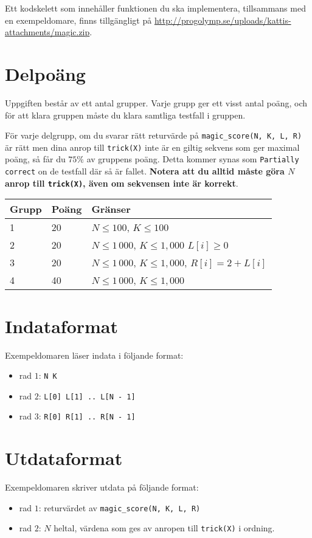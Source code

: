 Ett kodskelett som innehåller funktionen du ska implementera, tillsammans med en exempeldomare, finns tillgängligt på
\url{http://progolymp.se/uploads/kattis-attachments/magic.zip}.

\section*{Delpoäng}
Uppgiften består av ett antal grupper. Varje grupp ger ett visst antal poäng, och för att klara
gruppen måste du klara samtliga testfall i gruppen.

För varje delgrupp, om du svarar rätt returvärde på \texttt{magic\_score(N, K, L, R)} är rätt men dina anrop till \texttt{trick(X)}
inte är en giltig sekvens som ger maximal poäng, så får du $75\%$ av gruppens poäng.
Detta kommer synas som \texttt{Partially correct} on de testfall där så är fallet. \textbf{Notera att du alltid måste göra $N$ anrop till \texttt{trick(X)},
även om sekvensen inte är korrekt}.

\begin{tabular}{|l|l|l|}
  \hline
  \textbf{Grupp} & \textbf{Poäng} & \textbf{Gränser} \\ \hline
  1 & 20 & $N \le 100$, $K \le 100$ \\ \hline
  2 & 20 & $N \le 1\,000$, $K \le 1,000$ $L[i] \ge 0$\\ \hline
  3 & 20 & $N \le 1\,000$, $K \le 1,000$, $R[i] = 2 + L[i]$ \\ \hline
  4 & 40 & $N \le 1\,000$, $K \le 1,000$ \\ \hline
\end{tabular}

\section*{Indataformat}
Exempeldomaren läser indata i följande format:

\begin{itemize}
  \item rad $1$: \texttt{N K}
  \item rad $2$: \texttt{L[0] L[1] .. L[N - 1]}
  \item rad $3$: \texttt{R[0] R[1] .. R[N - 1]}
\end{itemize}

\section*{Utdataformat}
Exempeldomaren skriver utdata på följande format:

\begin{itemize}
  \item rad $1$: returvärdet av \texttt{magic\_score(N, K, L, R)}
  \item rad $2$: $N$ heltal, värdena som ges av anropen till \texttt{trick(X)} i ordning.
\end{itemize}
